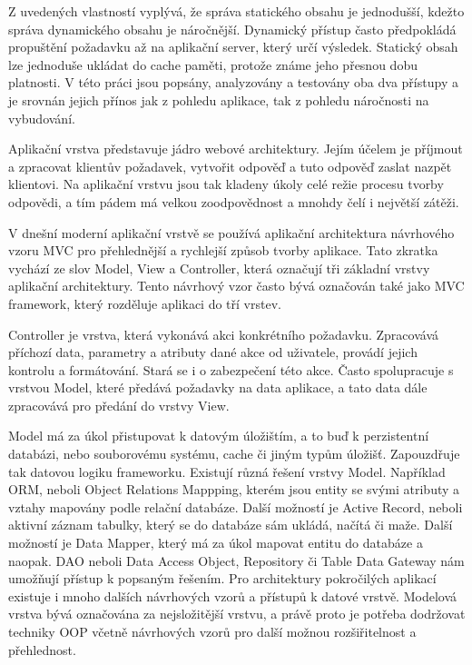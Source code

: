 \documentclass[12pt]{article}
\begin{document}
Z uvedených vlastností vyplývá, že správa statického obsahu je jednodušší, kdežto správa dynamického obsahu je náročnější. Dynamický přístup často předpokládá propuštění požadavku až na aplikační server, který určí výsledek. Statický obsah lze jednoduše ukládat do cache paměti, protože známe jeho přesnou dobu platnosti. V této práci jsou popsány, analyzovány a testovány oba dva přístupy a je srovnán jejich přínos jak z pohledu aplikace, tak z pohledu náročnosti na vybudování.

Aplikační vrstva představuje jádro webové architektury. Jejím účelem je příjmout a zpracovat klientův požadavek, vytvořit odpověď a tuto odpověď zaslat nazpět klientovi. Na aplikační vrstvu jsou tak kladeny úkoly celé režie procesu tvorby odpovědi, a tím pádem má velkou zoodpovědnost a mnohdy čelí i největší zátěži.

V dnešní moderní aplikační vrstvě se používá aplikační architektura návrhového vzoru MVC pro přehlednější a rychlejší způsob tvorby aplikace. Tato zkratka vychází ze slov Model, View a Controller, která označují tři základní vrstvy aplikační architektury. Tento návrhový vzor často bývá označován také jako MVC framework, který rozděluje aplikaci do tří vrstev. \cite{design-patterns}

Controller je vrstva, která vykonává akci konkrétního požadavku. Zpracovává příchozí data, parametry a atributy dané akce od uživatele, provádí jejich kontrolu a formátování. Stará se i o zabezpečení této akce. Často spolupracuje s vrstvou Model, které předává požadavky na data aplikace, a tato data dále zpracovává pro předání do vrstvy View. \cite{design-patterns}

Model má za úkol přistupovat k datovým úložištím, a to buď k perzistentní databázi, nebo souborovému systému, cache či jiným typům úložišť. Zapouzdřuje tak datovou logiku frameworku. Existují různá řešení vrstvy Model. Například ORM, neboli Object Relations Mappping, kterém jsou entity se svými atributy a vztahy mapovány podle relační databáze. Další možností je Active Record, neboli aktivní záznam tabulky, který se do databáze sám ukládá, načítá či maže. Další možností je Data Mapper, který má za úkol mapovat entitu do databáze a naopak. DAO neboli Data Access Object, Repository či Table Data Gateway nám umožňují přístup k popsaným řešením. Pro architektury pokročilých aplikací existuje i mnoho dalších návrhových vzorů a přístupů k datové vrstvě. Modelová vrstva bývá označována za nejsložitější vrstvu, a právě proto je potřeba dodržovat techniky OOP včetně návrhových vzorů pro další možnou rozšiřitelnost a přehlednost. \cite{design-patterns}
\end{document}
